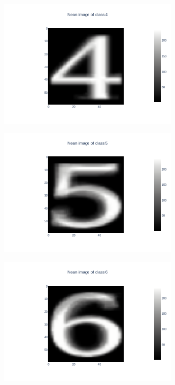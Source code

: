 \documentclass{article}
\begin{document}
\begin{figure}[h]
\begin{subfigure}{.3\linewidth}
        \includegraphics[width=\linewidth]{images/q2/partd/4_prototype.png}
    \end{subfigure}
    \hfill
    \begin{subfigure}{.3\linewidth}
        \centering
        \includegraphics[width=\linewidth]{images/q2/partd/5_prototype.png}
    \end{subfigure}
    \newline
    \begin{subfigure}{.3\linewidth}
        \centering
        \includegraphics[width=\linewidth]{images/q2/partd/6_prototype.png}

\end{subfigure}
\end{figure}
\end{document}
